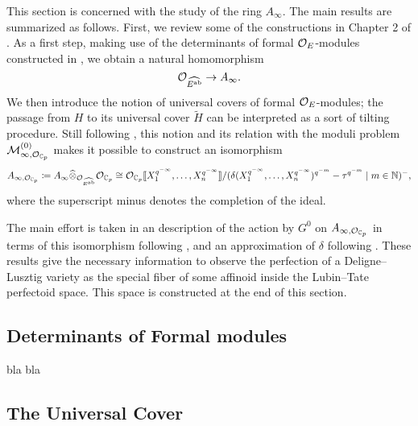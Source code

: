 \documentclass[../main.tex]{subfiles}
\begin{document}
This section is concerned with the study of the ring $A_\infty$. 
The main results are summarized as follows. 
First, we review some of the constructions in Chapter 2 of \cite{weinstein2016semistable}.
As a first step, making use of the determinants of formal $\mathcal{O}_E$-modules constructed in 
\cite{hedayatzadeh2015det}, we obtain a natural homomorphism
\begin{equation*}
   \mathcal{O}_{\widehat{E^{\mathrm{ab}}}} \to  A_\infty.
\end{equation*}
We then introduce the notion of universal covers of formal $\mathcal{O}_E$-modules; the 
passage from $H$ to its universal cover $\tilde H$ can be interpreted as a sort
of tilting procedure. Still following \cite{weinstein2016semistable}, this
notion and its relation with the moduli problem $\mathcal{M}_{\infty,
\mathcal{O}_{\mathbb{C}_p}}^{(0)}$ makes it possible to construct an isomorphism
\begin{equation*}
  A_{\infty, \mathcal{O}_{\mathbb{C}_p}} \coloneq A_\infty \widehat \otimes_{\mathcal{O}_{\widehat{E^{\mathrm{ab}}}}} \mathcal{O}_{\mathbb{C}_p} 
  \cong \mathcal{O}_{\mathbb{C}_p} \llbracket X_1^{q^{-\infty}}, \dots, X_n^{q^{-\infty}} \rrbracket /
  (\delta(X_1^{q^{-\infty}}, \dots, X_n^{q^{-\infty}})^{q^{-m}} - \tau^{q^{-m}} \mid 
  m \in \mathbb{N})^- ,
\end{equation*}
where the superscript minus denotes the completion of the ideal. 

The main effort is taken in an description of the action by $G^0$ 
on $A_{\infty,\mathcal{O}_{\mathbb{C}_p}}$ in terms of this isomorphism following
\cite[Section 1.2]{imaitsushima2020affinoids}, 
and an approximation of $\delta$ following \cite[Section
2.10]{BoyarchenkoWeinstein2011MaxVar}.
These results give the necessary information to observe the perfection of a
Deligne--Lusztig variety as the special fiber of some affinoid inside the
Lubin--Tate perfectoid space. This space is constructed at the end of this section.

\subsection{Determinants of Formal modules} %
\label{sub:Determinants of Formal modules}
bla bla

\subsection{The Universal Cover} %
\label{sub:Tate Modules and the Universal Cover}
\end{document}
